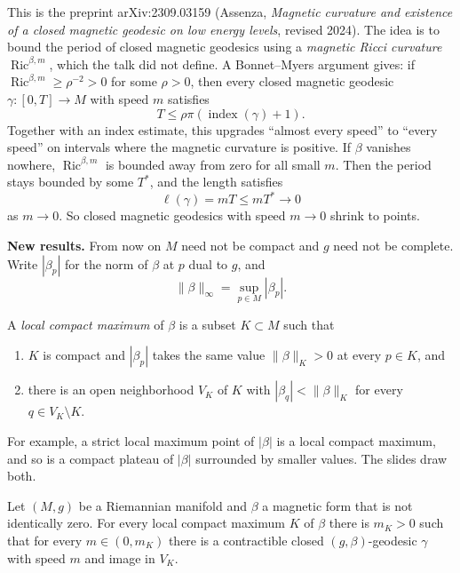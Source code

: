 This is the preprint arXiv:2309.03159
(Assenza, \emph{Magnetic curvature and
existence of a closed magnetic geodesic on
low energy levels}, revised 2024). The idea
is to bound the period of closed magnetic
geodesics using a \emph{magnetic Ricci
curvature} $\operatorname{Ric}^{\beta,m}$,
which the talk did not define. A
Bonnet--Myers argument gives: if
$\operatorname{Ric}^{\beta,m} \ge \rho^{-2}
> 0$ for some $\rho > 0$, then every closed
magnetic geodesic
$\gamma : [0,T] \to M$ with speed $m$
satisfies
$$
T \le \rho\pi
(\operatorname{index}(\gamma) + 1).
$$
Together with an index estimate, this
upgrades ``almost every speed'' to ``every
speed'' on intervals where the magnetic
curvature is positive. If $\beta$ vanishes
nowhere, $\operatorname{Ric}^{\beta,m}$ is
bounded away from zero for all small $m$.
Then the period stays bounded by some $T^*$,
and the length satisfies
$$
\ell(\gamma) = mT \le mT^* \to 0
$$
as $m \to 0$. So closed magnetic geodesics
with speed $m \to 0$ shrink to points.

\medskip\noindent
{\bf New results.} From now on $M$ need not
be compact and $g$ need not be complete.
Write $|\beta_p|$ for the norm of $\beta$ at
$p$ dual to $g$, and
$$
\|\beta\|_\infty = \sup_{p \in M}
|\beta_p|.
$$

\begin{definition}
\label{definition-local-max}
A \emph{local compact maximum} of $\beta$ is
a subset $K \subset M$ such that
\begin{enumerate}
\item $K$ is compact and $|\beta_p|$ takes
the same value $\|\beta\|_K > 0$ at every
$p \in K$, and
\item there is an open neighborhood $V_K$ of
$K$ with $|\beta_q| < \|\beta\|_K$ for every
$q \in V_K \setminus K$.
\end{enumerate}
\end{definition}

For example, a strict local maximum point of
$|\beta|$ is a local compact maximum, and so
is a compact plateau of $|\beta|$ surrounded
by smaller values. The slides draw both.

\begin{theorem}
\label{theorem-abm-local-maximum}
Let $(M,g)$ be a Riemannian manifold and
$\beta$ a magnetic form that is not
identically zero. For every local compact
maximum $K$ of $\beta$ there is $m_K > 0$
such that for every $m \in (0,m_K)$ there is
a contractible closed $(g,\beta)$-geodesic
$\gamma$ with speed $m$ and image in $V_K$.
\end{theorem}

